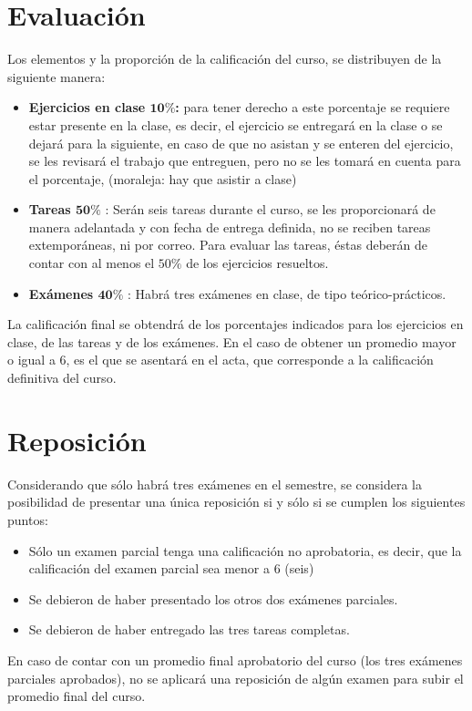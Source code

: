 \documentclass[12pt]{article}
\begin{document}
\section{Evaluación}
Los elementos y la proporción de la calificación del curso, se distribuyen de la siguiente manera:
\begin{itemize}
\item \textbf{Ejercicios en clase $\mathbf{10\%}$:} para tener derecho a este porcentaje se requiere estar presente en la clase, es decir, el ejercicio se entregará en la clase o se dejará para la siguiente, en caso de que no asistan y se enteren del ejercicio, se les revisará el trabajo que entreguen, pero no se les tomará en cuenta para el porcentaje, (moraleja: hay que asistir a clase) 
\item \textbf{Tareas $\mathbf{50\%}$} : Serán seis tareas durante el curso, se les proporcionará de manera adelantada y con fecha de entrega definida, no se reciben tareas extemporáneas, ni por correo. Para evaluar las tareas, éstas deberán de contar con al menos el $50\%$ de los ejercicios resueltos. 
\item \textbf{Exámenes $\mathbf{40\%}$} : Habrá tres exámenes en clase, de tipo teórico-prácticos. 
\end{itemize}
La calificación final se obtendrá de los porcentajes indicados para los ejercicios en clase, de las tareas y de los exámenes. En el caso de obtener un promedio mayor o igual a $6$, es el que se asentará en el acta, que corresponde a la calificación definitiva del curso.
\section{Reposición}
Considerando que sólo habrá tres exámenes en el semestre, se considera la posibilidad de presentar una única reposición si y sólo si se cumplen los siguientes puntos:
\begin{itemize}
	\item Sólo un examen parcial tenga una calificación no aprobatoria, es decir, que la calificación del examen parcial sea menor a $6$ (seis)
	\item Se debieron de haber presentado los otros dos exámenes parciales.
	\item Se debieron de haber entregado las tres tareas completas.
\end{itemize}
En caso de contar con un promedio final aprobatorio del curso (los tres exámenes parciales aprobados), no se aplicará una reposición de algún examen para subir el promedio final del curso.
\end{document}
